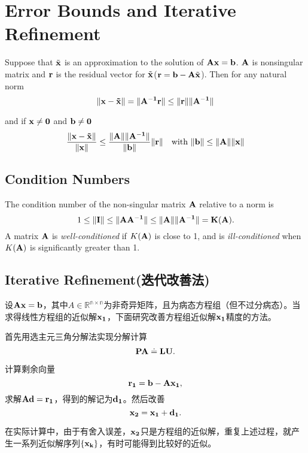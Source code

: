 \section{Error Bounds and Iterative Refinement}
\begin{theo}
Suppose that $\tilde{\bf x}$ is an approximation to the solution of $\bf Ax=b$. $\bf A$ is nonsingular matrix and $\bf r$ is the residual vector for $\tilde{\bf x}$(${\bf r=b-A}\tilde{\bf x}$). Then for any natural norm
\[
\|\bf x-\tilde{\bf x}\| = \bf\|A^{-1}r\| \leq \|r\|\|A^{-1}\|
\]
\end{theo}
and if $\bf x\neq 0$ and $\bf b\neq 0$
\[
\frac{\|\bf x-\tilde{\bf x}\|}{\|\bf x\|}\leq\frac{\|\bf A\|\|\bf A^{-1}\|}{\|\bf b\|}\|\bf r\|\quad\text{with $\|\bf b\|\leq\|\bf A\|\|\bf x\|$}
\]

\subsection{Condition Numbers}
\begin{defn}
The condition number of the non-singular matrix $\bf A$ relative to a norm \norms{\cdot} is
\[
1\leq\|\bf I\|\leq\|\bf A\bf A^{-1}\|\leq\|\bf A\|\|\bf A^{-1}\|=K(\bf A).
\]
A matrix $\bf A$ is \emph{well-conditioned} if $K(\bf A)$ is close to 1, and is \emph{ill-conditioned} when $K(\bf A)$ is significantly greater than 1.
\end{defn}

\subsection[Iterative Refinement]{Iterative Refinement(迭代改善法)}
设$\bf Ax=b$，其中$A\in\mathbb{R^{n\times n}}$为非奇异矩阵，且为病态方程组（但不过分病态）。当求得线性方程组的近似解$\bf x_1$，下面研究改善方程组近似解$\bf x_1$精度的方法。\par
首先用选主元三角分解法实现分解计算
\[
\bf PA\doteq LU.
\]

计算剩余向量
\[
\bf r_1=b-Ax_1,
\]
求解$\bf Ad=r_1$，得到的解记为$\bf d_1$。然后改善
\[
\bf x_2=x_1+d_1.
\]

在实际计算中，由于有舍入误差，$\bf x_2$只是方程组的近似解，重复上述过程，就产生一系列近似解序列$\{\bf x_k\}$，有时可能得到比较好的近似。
